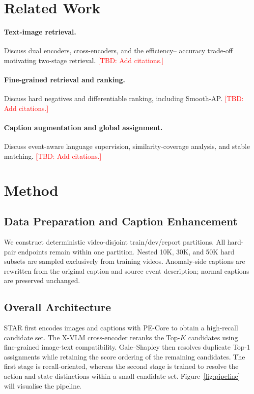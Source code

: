 \documentclass[runningheads]{llncs}
\newcommand{\todo}[1]{\textcolor{red}{[TBD: #1]}}
\begin{document}
\section{Related Work}
\paragraph{Text-image retrieval.} Discuss dual encoders, cross-encoders, and the efficiency--
accuracy trade-off motivating two-stage retrieval. \todo{Add citations.}
\paragraph{Fine-grained retrieval and ranking.} Discuss hard negatives and differentiable ranking,
including Smooth-AP. \todo{Add citations.}
\paragraph{Caption augmentation and global assignment.} Discuss event-aware language supervision,
similarity-coverage analysis, and stable matching. \todo{Add citations.}

\section{Method}
\subsection{Data Preparation and Caption Enhancement}
We construct deterministic video-disjoint train/dev/report partitions. All hard-pair endpoints
remain within one partition. Nested 10K, 30K, and 50K hard subsets are sampled exclusively from
training videos. Anomaly-side captions are rewritten from the original caption and source event
description; normal captions are preserved unchanged.

\subsection{Overall Architecture}
STAR first encodes images and captions with PE-Core to obtain a high-recall candidate set. The
X-VLM cross-encoder reranks the Top-$K$ candidates using fine-grained image-text compatibility.
Gale--Shapley then resolves duplicate Top-1 assignments while retaining the score ordering of
the remaining candidates. The first stage is recall-oriented, whereas the second stage is trained
to resolve the action and state distinctions within a small candidate set. Figure~\ref{fig:pipeline}
will visualise the pipeline.
\end{document}
